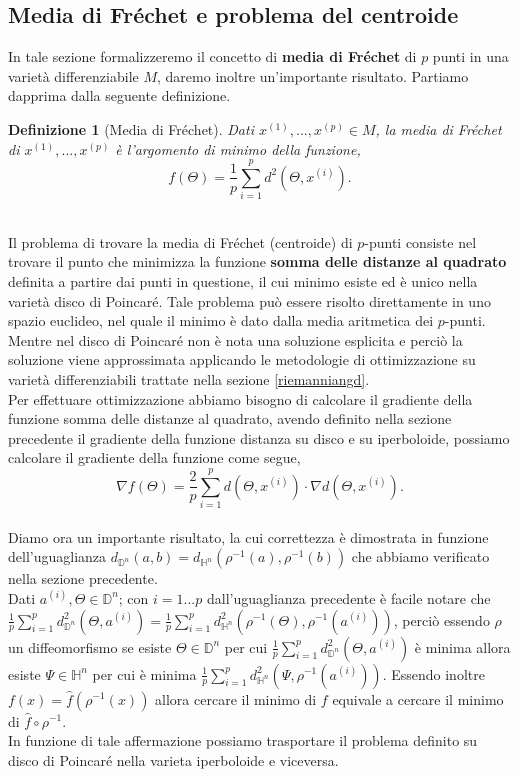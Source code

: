 \documentclass[a4paper, 12pt]{article}
\newtheorem{definition}{Definizione}
\begin{document}
\subsection{Media di Fréchet e problema del centroide}
In tale sezione formalizzeremo il concetto di \textbf{media di Fréchet} di $p$ punti in una varietà differenziabile $M$, daremo inoltre un'importante risultato. Partiamo dapprima dalla seguente definizione.
\begin{definition}[Media di Fréchet]
Dati $x^{(1)}, ..., x^{(p)} \in M$, la media di Fréchet di $x^{(1)}, ..., x^{(p)}$ è l'argomento di minimo della funzione,\\
\[f(\Theta) = \frac{1}{p}\sum_{i=1}^p d^2(\Theta, x^{(i)}).\]\\
\end{definition}
Il problema di trovare la media di Fréchet (centroide) di $p$-punti consiste nel trovare il punto che minimizza la funzione \textbf{somma delle distanze al quadrato} definita a partire dai punti in questione, il cui minimo esiste ed è unico nella varietà disco di Poincaré. Tale problema può essere risolto direttamente in uno spazio euclideo, nel quale il minimo è dato dalla media aritmetica dei $p$-punti. Mentre nel disco di Poincaré non è nota una soluzione esplicita e perciò la soluzione viene approssimata applicando le metodologie di ottimizzazione su varietà differenziabili trattate nella sezione \ref{riemanniangd}.\\
Per effettuare ottimizzazione abbiamo bisogno di calcolare il gradiente della funzione somma delle distanze al quadrato, avendo definito nella sezione precedente il gradiente della funzione distanza su disco e su iperboloide, possiamo calcolare il gradiente della funzione come segue,\\
\[\nabla f(\Theta) = \frac{2}{p} \sum_{i=1}^p d(\Theta, x^{(i)}) \cdot \nabla d(\Theta, x^{(i)}).\]\\
Diamo ora un importante risultato, la cui correttezza è dimostrata in funzione dell'uguaglianza $d_{\mathbb{D}^n}(a, b) = d_{\mathbb{H}^n}(\rho^{-1}(a), \rho^{-1}(b))$ che abbiamo verificato nella sezione precedente.\\
Dati $a^{(i)}, \Theta \in \mathbb{D}^n$; con $i = 1...p$ dall'uguaglianza precedente è facile notare che $\frac{1}{p}\sum_{i=1}^p d_{\mathbb{D}^n}^2(\Theta, a^{(i)}) = \frac{1}{p}\sum_{i=1}^p d_{\mathbb{H}^n}^2(\rho^{-1}(\Theta), \rho^{-1}(a^{(i)}))$, perciò essendo $\rho$ un diffeomorfismo se esiste $\Theta \in \mathbb{D}^n$ per cui $\frac{1}{p}\sum_{i=1}^p d_{\mathbb{D}^n}^2(\Theta, a^{(i)})$ è minima allora esiste $\Psi \in \mathbb{H}^n$ per cui è minima $\frac{1}{p}\sum_{i=1}^p d_{\mathbb{H}^n}^2(\Psi, \rho^{-1}(a^{(i)}))$. Essendo inoltre $f(x) = \hat{f}(\rho^{-1}(x))$ allora cercare il minimo di $f$ equivale a cercare il minimo di $\hat{f} \circ \rho^{-1}$.\\
In funzione di tale affermazione possiamo trasportare il problema definito su disco di Poincaré nella varieta iperboloide e viceversa.
\end{document}
